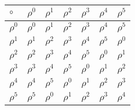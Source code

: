 \documentclass{article}
\begin{document}
\begin{itemize}
\begin{tabular}{l|llllll}
\(\circ\) & \(\rho^0\) & \(\rho^1\) & \(\rho^2\) & \(\rho^3\) & \(\rho^4\) & \(\rho^5\)\\
\hline
\(\rho^0\) & \(\rho^0\) & \(\rho^1\) & \(\rho^2\) & \(\rho^3\) & \(\rho^4\) & \(\rho^5\)\\
\(\rho^1\) & \(\rho^1\) & \(\rho^2\) & \(\rho^3\) & \(\rho^4\) & \(\rho^5\) & \(\rho^0\)\\
\(\rho^2\) & \(\rho^2\) & \(\rho^3\) & \(\rho^4\) & \(\rho^5\) & \(\rho^0\) & \(\rho^1\)\\
\(\rho^3\) & \(\rho^3\) & \(\rho^4\) & \(\rho^5\) & \(\rho^0\) & \(\rho^1\) & \(\rho^2\)\\
\(\rho^4\) & \(\rho^4\) & \(\rho^5\) & \(\rho^0\) & \(\rho^1\) & \(\rho^2\) & \(\rho^3\)\\
\(\rho^5\) & \(\rho^5\) & \(\rho^0\) & \(\rho^1\) & \(\rho^2\) & \(\rho^3\) & \(\rho^4\)\\
\end{tabular}
\begin{comment}
#+ORGTBL: SEND  mul orgtbl-to-latex :splice nil :skip 0
| $\circ$  | $\rho^0$ | $\rho^1$ | $\rho^2$ | $\rho^3$ | $\rho^4$ | $\rho^5$ |
|----------+----------+----------+----------+----------+----------+----------|
| /        | <        |          |          |          |          |          |
| $\rho^0$ | $\rho^0$ | $\rho^1$ | $\rho^2$ | $\rho^3$ | $\rho^4$ | $\rho^5$ |
| $\rho^1$ | $\rho^1$ | $\rho^2$ | $\rho^3$ | $\rho^4$ | $\rho^5$ | $\rho^0$ |
| $\rho^2$ | $\rho^2$ | $\rho^3$ | $\rho^4$ | $\rho^5$ | $\rho^0$ | $\rho^1$ |
| $\rho^3$ | $\rho^3$ | $\rho^4$ | $\rho^5$ | $\rho^0$ | $\rho^1$ | $\rho^2$ |
| $\rho^4$ | $\rho^4$ | $\rho^5$ | $\rho^0$ | $\rho^1$ | $\rho^2$ | $\rho^3$ |
| $\rho^5$ | $\rho^5$ | $\rho^0$ | $\rho^1$ | $\rho^2$ | $\rho^3$ | $\rho^4$ |

\end{comment}
\end{itemize}
\end{document}
